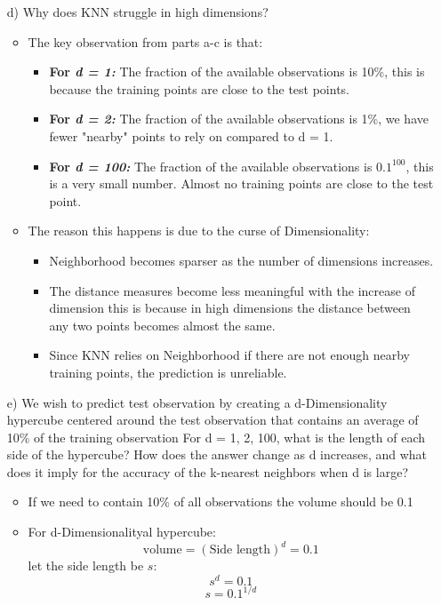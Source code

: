 \documentclass{article}
\begin{document}
\begin{enumerate}
 \item[d)] Why does KNN struggle in high dimensions?
    \begin{itemize}
        \item The key observation from parts a-c is that:
         \begin{itemize}
            \item \textbf{For \textit{d = 1:}} The fraction of the available observations is 10\%, this is because the training points are close to the test points.
            \item \textbf{For \textit{d = 2:}} The fraction of the available observations is 1\%, we have fewer "nearby" points to rely on compared to d = 1.
            \item \textbf{For \textit{d = 100:}} The fraction of the available observations is $0.1^{100}$, this is a very small number. Almost no training points are close to the test point.
         \end{itemize}
        \item The reason this happens is due to the curse of Dimensionality:
         \begin{itemize}
            \item Neighborhood becomes sparser as the number of dimensions increases.
            \item The distance measures become less meaningful with the increase of dimension this is because
            in high dimensions the distance between any two points becomes almost the same.
            \item Since KNN relies on Neighborhood if there are not enough nearby training points, the prediction is unreliable.
         \end{itemize}
    \end{itemize}

 \item [e)] We wish to predict test observation by creating a d-Dimensionality hypercube centered around the test observation that contains an average of 10\% of the training observation
 For d = 1, 2, 100, what is the length of each side of the hypercube? How does the answer change as d increases, and what does it imply for the accuracy of the k-nearest neighbors when d is large?\\

 \begin{itemize}
    \item If we need to contain 10\% of all observations the volume should be 0.1
    \item For d-Dimensionalityal hypercube:
    \[
    \text{volume} = (\text{Side length})^d = 0.1
    \]
    let the side length be $s$:
    \[
    s^d = 0.1 
    \]
   \[s = 0.1^{1/d}\]
    

\end{itemize}
\end{enumerate}
\end{document}
